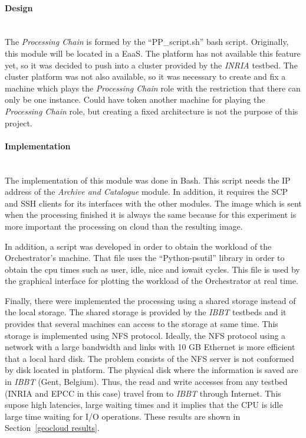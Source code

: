 \paragraph{Design}~\\

The \emph{Processing Chain} is formed by the ``PP\_script.sh'' bash
script. Originally, this module will be located in a \acl{EaaS}. The \bonfire
platform has not available this feature yet, so it was decided to push into a
cluster provided by the \emph{INRIA} testbed. The cluster platform was not also
available, so it was necessary to create and fix a machine which plays the
\emph{Processing Chain} role with the restriction that there can only be one
instance. Could have token another machine for playing the \emph{Processing
  Chain} role, but creating a fixed architecture is not the purpose of this
project.

\paragraph{Implementation}~\\
\label{par:pp-impl}
The implementation of this module was done in Bash. This script needs the
\ac{IP} address of the \emph{Archive and Catalogue} module. In addition, it
requires the \ac{SCP} and \ac{SSH} clients for its interfaces with the other
modules. The image which is sent when the processing finished it is always the
same because for this experiment is more important the processing on cloud than
the resulting image.
  
In addition, a script was developed in order to obtain the workload of the
Orchestrator's machine. That file uses the ``Python-psutil'' library in order to
obtain the cpu times such as user, idle, nice and iowait cycles. This file is
used by the graphical interface for plotting the workload of the Orchestrator at
real time.

Finally, there were implemented the processing using a shared storage instead of
the local storage. The shared storage is provided by the \emph{IBBT} testbeds
and it provides that several machines can access to the storage at same
time. This storage is implemented using \ac{NFS} protocol. Ideally, the \ac{NFS}
protocol using a network with a large bandwidth and links with 10 GB Ethernet is
more efficient that a local hard disk. The problem consists of the \ac{NFS}
server is not conformed by disk located in \bonfire platform. The physical disk
where the information is saved are in \emph{IBBT} (Gent, Belgium). Thus, the
read and write accesses from any \bonfire testbed (INRIA and EPCC in this case)
travel from \bonfire to \emph{IBBT} through Internet. This supose high
latencies, large waiting times and it implies that the CPU is idle large time
waiting for I/O operations. These results are shown in Section~\ref{geocloud
  results}.

